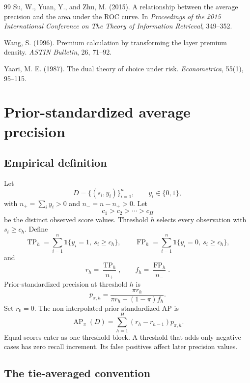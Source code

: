 \documentclass[11pt]{article}
\newcommand{\AP}{\operatorname{AP}}
\theoremstyle{remark}
\begin{document}
\begin{thebibliography}{99}
Su, W., Yuan, Y., and Zhu, M. (2015).
A relationship between the average precision and the area under the ROC curve.
In \emph{Proceedings of the 2015 International Conference on The Theory of Information Retrieval}, 349--352.

Wang, S. (1996).
Premium calculation by transforming the layer premium density.
\emph{ASTIN Bulletin}, 26, 71--92.

Yaari, M. E. (1987).
The dual theory of choice under risk.
\emph{Econometrica}, 55(1), 95--115.

\end{thebibliography}

\appendix

\section{Prior-standardized average precision}
\label{app:ap-definition}

\subsection{Empirical definition}

Let
\[
D=\{(s_i,y_i)\}_{i=1}^{n},
\qquad
y_i\in\{0,1\},
\]
with $n_+=\sum_i y_i>0$ and $n_-=n-n_+>0$. Let
\[
c_1>c_2>\cdots>c_H
\]
be the distinct observed score values. Threshold $h$ selects every observation with $s_i\geq c_h$. Define
\[
\operatorname{TP}_h
=
\sum_{i=1}^{n}
\mathbf{1}\{y_i=1,\ s_i\geq c_h\},
\qquad
\operatorname{FP}_h
=
\sum_{i=1}^{n}
\mathbf{1}\{y_i=0,\ s_i\geq c_h\},
\]
and
\[
r_h=\frac{\operatorname{TP}_h}{n_+},
\qquad
f_h=\frac{\operatorname{FP}_h}{n_-}.
\]
Prior-standardized precision at threshold $h$ is
\[
p_{\pi,h}
=
\frac{\pi r_h}
{\pi r_h+(1-\pi)f_h}.
\]
Set $r_0=0$. The non-interpolated prior-standardized AP is
\begin{equation}
\AP_\pi(D)
=
\sum_{h=1}^{H}
(r_h-r_{h-1})p_{\pi,h}.
\label{eq:empirical-ap}
\end{equation}
Equal scores enter as one threshold block. A threshold that adds only negative cases has zero recall increment. Its false positives affect later precision values.

\subsection{The tie-averaged convention}
\label{app:tie-convention}
\end{document}
